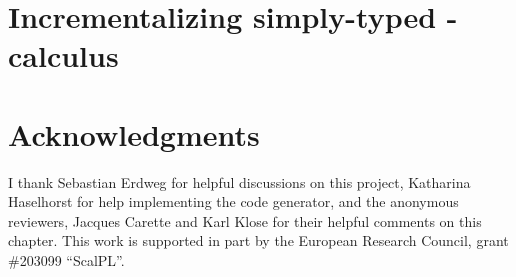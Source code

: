 \documentclass{book}
\begin{document}




\newcommand{\co}[1]{\code{#1}} %



\chapter{Incrementalizing simply-typed \TitleLambda{}-calculus}
















\begin{oldSec}

\end{oldSec}

\begin{oldSec}

\end{oldSec}




\chapter*{Acknowledgments}
I thank Sebastian Erdweg for helpful discussions on
this project, Katharina Haselhorst for help
implementing the code generator, and the anonymous reviewers, Jacques Carette and Karl Klose
for their helpful comments on this chapter.
This work is supported in part by the European Research Council, grant \#203099 ``ScalPL''.
\end{document}
